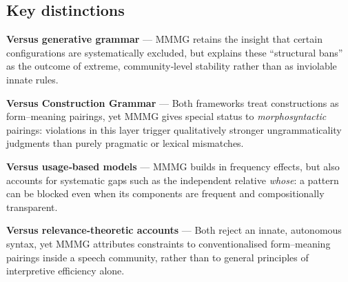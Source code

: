 \documentclass[12pt]{article}
\begin{document}
\subsection{Key distinctions}

\textbf{Versus generative grammar} —  
MMMG retains the insight that certain configurations are systematically excluded, but explains these \enquote{structural bans} as the outcome of extreme, community‑level stability rather than as inviolable innate rules.

\textbf{Versus Construction Grammar} —  
Both frameworks treat constructions as form–meaning pairings, yet MMMG gives special status to \emph{morphosyntactic} pairings: violations in this layer trigger qualitatively stronger ungrammaticality judgments than purely pragmatic or lexical mismatches.

\textbf{Versus usage‑based models} —  
MMMG builds in frequency effects, but also accounts for systematic gaps such as the independent relative \textit{whose}: a pattern can be blocked even when its components are frequent and compositionally transparent.

\textbf{Versus relevance‑theoretic accounts} —  
Both reject an innate, autonomous syntax, yet MMMG attributes constraints to conventionalised form–meaning pairings inside a speech community, rather than to general principles of interpretive efficiency alone.



\end{document}
